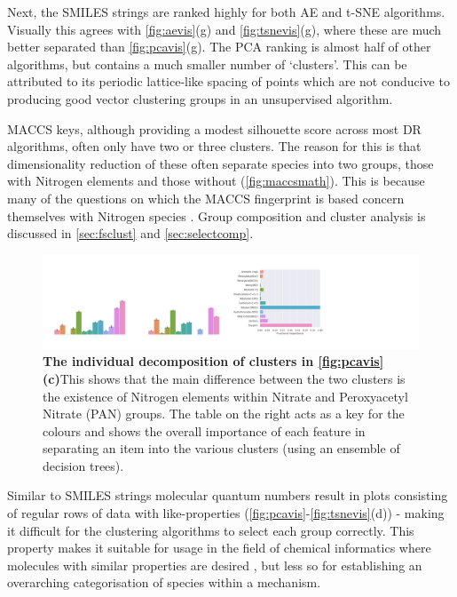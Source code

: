 Next, the SMILES strings are ranked highly for both AE and t-SNE algorithms. Visually this agrees with \autoref{fig:aevis}(g) and \autoref{fig:tsnevis}(g), where these are much better separated than \autoref{fig:pcavis}(g). The PCA ranking is almost half of other algorithms, but contains a much smaller number of `clusters'. This can be attributed to its periodic lattice-like spacing of points which are not conducive to producing good vector clustering groups in an unsupervised algorithm.

MACCS keys, although providing a modest silhouette score across most DR algorithms, often only have two or three clusters. The reason for this is that dimensionality reduction of these often separate species into two groups, those with Nitrogen elements and those without (\autoref{fig:maccsmath}). This is because many of the questions on which the MACCS fingerprint is based concern themselves with Nitrogen species \citep{rdkitcode}. Group composition and cluster analysis is discussed in \autoref{sec:fsclust} and \autoref{sec:selectcomp}.\\

\begin{figure}[H]
    \includegraphics[width=1.3\textwidth]{outputs/PCA/maccs/group.png}
    \caption{\textbf{The individual decomposition of clusters in \autoref{fig:pcavis}(c)}This shows that the main difference between the two clusters is the existence of Nitrogen elements within Nitrate and Peroxyacetyl Nitrate (PAN) groups. The table on the right acts as a key for the colours and shows the overall importance of each feature in separating an item into the various clusters (using an ensemble of decision trees).}
    \label{fig:maccsmath}
\end{figure}

Similar to SMILES strings molecular quantum numbers result in plots consisting of regular rows of data with like-properties (\autoref{fig:pcavis}-\ref{fig:tsnevis}(d)) - making it difficult for the clustering algorithms to select each group correctly. This property makes it suitable for usage in the field of chemical informatics where molecules with similar properties are desired \citep{mqnpca}, but less so for establishing an overarching categorisation of species within a mechanism.

